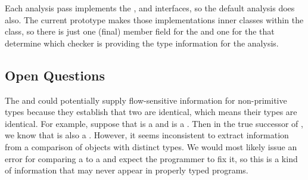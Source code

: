 Each analysis pass implements the ,  and 
 interfaces, so the
default analysis does also.  The current prototype makes those implementations inner
classes within the  class, so there is just one (final) member field
for the  and one for the  that determine 
which checker is providing the type information for the analysis.


\subsection{Open Questions}

\begin{workinprogress}
The  and  could potentially supply flow-sensitive
information for 
non-primitive types because they establish that two  are identical, which means their 
types are identical.  For example, suppose that  is a  and  is 
a .  Then
in the true successor of , we know that  is also a 
.  However, it 
seems inconsistent to extract information from a comparison of objects with distinct types.  
We would most likely issue an error for comparing a  to a 
and expect the
programmer to fix it, so this is a kind of information that may never appear in properly typed
programs.
\end{workinprogress}
















